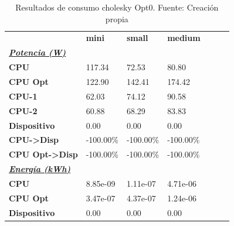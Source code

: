 \begin{table}[H]
    \centering
    \begin{tabular}{lllllll}
    \rowcolor[HTML]{DAE8FC} \ & \textbf{mini} & \textbf{	small} & \textbf{	medium} \\
    \cellcolor[HTML]{DAE8FC} \textbf{\textbf{{\emph{{\underline{{Potencia (W)}}}}}}} &  & 	 & 	 \\
    \rowcolor[HTML]{EFEFEF} \cellcolor[HTML]{DAE8FC} \textbf{CPU} & 117.34 & 	72.53 & 	80.80 \\
    \cellcolor[HTML]{DAE8FC} \textbf{CPU Opt} & 122.90 & 	142.41 & 	174.42 \\
    \rowcolor[HTML]{EFEFEF} \cellcolor[HTML]{DAE8FC} \textbf{\quad CPU-1} & 62.03 & 	74.12 & 	90.58 \\
    \cellcolor[HTML]{DAE8FC} \textbf{\quad CPU-2} & 60.88 & 	68.29 & 	83.83 \\
    \rowcolor[HTML]{EFEFEF} \cellcolor[HTML]{DAE8FC} \textbf{Dispositivo} & 0.00 & 	0.00 & 	0.00 \\
    \cellcolor[HTML]{DAE8FC} \textbf{CPU->Disp} & -100.00\% & 	-100.00\% & 	-100.00\% \\
    \rowcolor[HTML]{EFEFEF} \cellcolor[HTML]{DAE8FC} \textbf{CPU Opt->Disp} & -100.00\% & 	-100.00\% & 	-100.00\% \\
    \cellcolor[HTML]{DAE8FC} \textbf{\textbf{{\emph{{\underline{{Energía (kWh)}}}}}}} &  & 	 & 	 \\
    \rowcolor[HTML]{EFEFEF} \cellcolor[HTML]{DAE8FC} \textbf{CPU} & 8.85e-09 & 	1.11e-07 & 	4.71e-06 \\
    \cellcolor[HTML]{DAE8FC} \textbf{CPU Opt} & 3.47e-07 & 	4.37e-07 & 	1.24e-06 \\
    \rowcolor[HTML]{EFEFEF} \cellcolor[HTML]{DAE8FC} \textbf{Dispositivo} & 0.00 & 	0.00 & 	0.00 \\
    \end{tabular}
    \caption[Resultados de consumo cholesky Opt0]{{Resultados de consumo cholesky Opt0. Fuente: Creación propia}}
    \label{table_test_cholesky_Opt0_hw_powerResults}
\end{table}